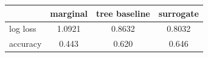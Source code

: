 \begin{tabular}{lccc}
\toprule
 & marginal & tree baseline & surrogate \\
\midrule
log loss & 1.0921 & 0.8632 & 0.8032 \\
accuracy & 0.443 & 0.620 & 0.646 \\
\bottomrule
\end{tabular}

